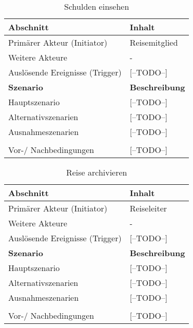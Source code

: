 \begin{table}[H]
	\caption{Schulden einsehen}
	\begin{tabularx}{0.95\textwidth}{ |X|X| }
		\hline
		\rowcolor{gray} \textbf{Abschnitt}     & \textbf{Inhalt}       \\
		\hline
		Primärer Akteur (Initiator)            & Reisemitglied         \\
		\hline
		Weitere Akteure                        & -                     \\
		\hline
		Auslösende Ereignisse (Trigger)        & [--TODO--]            \\

		\hline
		\rowcolor{lightgray} \textbf{Szenario} & \textbf{Beschreibung} \\
		\hline
		Hauptszenario                          & [--TODO--]            \\
		\hline
		Alternativszenarien                    & [--TODO--]            \\
		\hline
		Ausnahmeszenarien                      & [--TODO--]            \\
		\hline
		\rowcolor{lightgray}                   &                       \\
		\hline
		Vor-/ Nachbedingungen                  & [--TODO--]            \\
		\hline
	\end{tabularx}
\end{table}


\begin{table}[H]
	\caption{Reise archivieren}
	\begin{tabularx}{0.95\textwidth}{ |X|X| }
		\hline
		\rowcolor{gray} \textbf{Abschnitt}     & \textbf{Inhalt}       \\
		\hline
		Primärer Akteur (Initiator)            & Reiseleiter           \\
		\hline
		Weitere Akteure                        & -                     \\
		\hline
		Auslösende Ereignisse (Trigger)        & [--TODO--]            \\

		\hline
		\rowcolor{lightgray} \textbf{Szenario} & \textbf{Beschreibung} \\
		\hline
		Hauptszenario                          & [--TODO--]            \\
		\hline
		Alternativszenarien                    & [--TODO--]            \\
		\hline
		Ausnahmeszenarien                      & [--TODO--]            \\
		\hline
		\rowcolor{lightgray}                   &                       \\
		\hline
		Vor-/ Nachbedingungen                  & [--TODO--]            \\
		\hline
	\end{tabularx}
\end{table}


